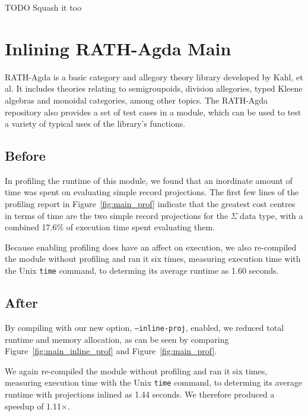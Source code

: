 TODO Squash it too

\section{Inlining RATH-Agda Main}
\label{sec:app_one}

RATH-Agda is a basic category and allegory theory library developed by Kahl, et al.\cite{kahl2017} It includes theories relating to semigroupoids, division allegories, typed Kleene algebras and monoidal categories, among other topics.\cite{kahl2017} The RATH-Agda repository also provides a set of test cases in a  module, which can be used to test a variety of typical uses of the library's functions.

\subsection{Before}



In profiling the runtime of this  module, we found that an inordinate amount of time was spent on evaluating simple record projections. The first few lines of the profiling report in Figure~\ref{fig:main_prof} indicate that the greatest cost centres in terms of time are the two simple record projections for the $\Sigma$ data type, with a combined 17.6\% of execution time spent evaluating them.

Because enabling profiling does have an affect on execution, we also re-compiled the module without profiling and ran it six times, measuring execution time with the Unix \texttt{time} command, to determing its average runtime as 1.60 seconds.

\subsection{After}



By compiling  with our new option, \texttt{--inline-proj}, enabled, we reduced total runtime and memory allocation, as can be seen by comparing Figure~\ref{fig:main_inline_prof} and Figure~\ref{fig:main_prof}.

We again re-compiled the module without profiling and ran it six times, measuring execution time with the Unix \texttt{time} command, to determing its average runtime with projections inlined as 1.44 seconds. We therefore produced a speedup of 1.11$\times$.

